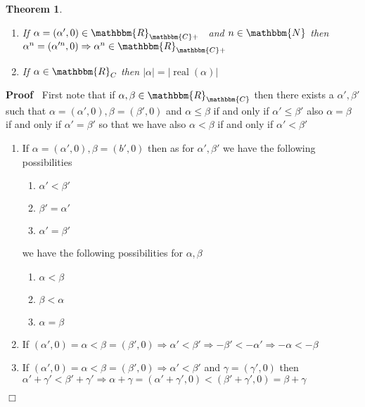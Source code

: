 \documentclass{book}
\newcommand{\tmop}[1]{\ensuremath{\operatorname{#1}}}
\newenvironment{proof}{\noindent\textbf{Proof\ }}{\hspace*{\fill}$\Box$\medskip}
\newtheorem{theorem}{Theorem}
\begin{document}
{{\begin{theorem}
\begin{enumerate}
    \item If $\alpha = (\alpha', 0) \in \mathbbm{R}_{\mathbbm{C}+}$ \ and $n
    \in \mathbbm{N}$ then $\alpha^n = (\alpha^{\prime n}, 0) \Rightarrow
    \alpha^n \in \mathbbm{R}_{\mathbbm{C}+}$
    
    \item If $\alpha \in \mathbbm{R}_C$ then $| \alpha | = | \tmop{real}
    (\alpha) |$
  \end{enumerate}
\end{theorem}

\begin{proof}
  First note that if $\alpha, \beta \in \mathbbm{R}_{\mathbbm{C}}$ then there
  exists a $\alpha', \beta'$ such that $\alpha = (\alpha', 0), \beta =
  (\beta', 0)$ and $\alpha \leqslant \beta$ if and only if $\alpha' \leqslant
  \beta'$ also $\alpha = \beta$ if and only if $\alpha' = \beta'$ so that we
  have also $\alpha < \beta$ if and only if $\alpha' < \beta'$
  \begin{enumerate}
    \item If $\alpha = (\alpha', 0), \beta = (b', 0)$ then as for $\alpha',
    \beta'$ we have the following possibilities
    \begin{enumerate}
      \item $\alpha' < \beta'$
      
      \item $\beta' = \alpha'$
      
      \item $\alpha' = \beta'$
    \end{enumerate}
    we have the following possibilities for $\alpha, \beta$
    \begin{enumerate}
      \item $\alpha < \beta$
      
      \item $\beta < \alpha$
      
      \item $\alpha = \beta$
    \end{enumerate}
    \item If $(\alpha', 0) = \alpha < \beta = (\beta', 0) \Rightarrow \alpha'
    < \beta' \Rightarrow - \beta' < - \alpha' \Rightarrow - \alpha < - \beta$
    
    \item If $(\alpha', 0) = \alpha < \beta = (\beta', 0) \Rightarrow \alpha'
    < \beta'$ and $\gamma = (\gamma', 0)$ then $\alpha' + \gamma' < \beta' +
    \gamma' \Rightarrow \alpha + \gamma = (\alpha' + \gamma', 0) < (\beta' +
    \gamma', 0) = \beta + \gamma$
    

\end{enumerate}
\end{proof}}}
\end{document}
